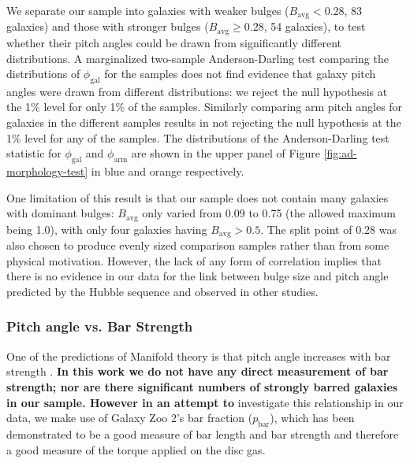 We separate our sample into galaxies with weaker bulges ($B_\mathrm{avg} < 0.28$, 83 galaxies) and those with stronger bulges ($B_\mathrm{avg} \ge 0.28$, 54 galaxies), to test whether their pitch angles could be drawn from significantly different distributions. A marginalized two-sample Anderson-Darling test comparing the distributions of $\phi_\mathrm{gal}$ for the samples does not find evidence that galaxy pitch angles were drawn from different distributions: we reject the null hypothesis at the 1\% level for only 1\% of the samples. Similarly comparing arm pitch angles for galaxies in the different samples results in not rejecting the null hypothesis at the 1\% level for any of the samples. The distributions of the Anderson-Darling test statistic for $\phi_\mathrm{gal}$ and $\phi_\mathrm{arm}$ are shown in the upper panel of Figure \ref{fig:ad-morphology-test} in blue and orange respectively.

One limitation of this result is that our sample does not contain many galaxies with dominant bulges: $B_\mathrm{avg}$ only varied from 0.09 to 0.75 (the allowed maximum being 1.0), with only four galaxies having $B_\mathrm{avg} > 0.5$. The split point of 0.28 was also chosen to produce evenly sized comparison samples rather than from some physical motivation. However, the lack of any form of correlation implies that there is no evidence in our data for the link between bulge size and pitch angle predicted by the Hubble sequence and observed in other studies.

\subsubsection{Pitch angle vs. Bar Strength}
\label{section:morphology-comparison-bar}

One of the predictions of Manifold theory is that pitch angle increases with bar strength \citep{2009MNRAS.400.1706A}. \textbf{In this work we do not have any direct measurement of bar strength; nor are there significant numbers of strongly barred galaxies in our sample. However in an attempt to} investigate this relationship in our data, we make use of Galaxy Zoo 2's bar fraction ($p_\mathrm{bar}$), which has been demonstrated to be a good measure of bar length \citep{Willett2013:1308.3496v2} and bar strength \citep{2012MNRAS.423.1485S,2012MNRAS.424.2180M,2018MNRAS.473.4731K} and therefore a good measure of the torque applied on the disc gas.

